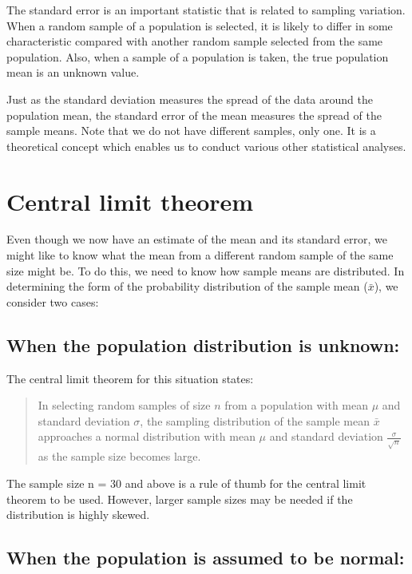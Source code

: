 \documentclass[
]{memoir}
\begin{document}
The standard error is an important statistic that is related to sampling variation. When a random sample of a population is selected, it is likely to differ in some characteristic compared with another random sample selected from the same population. Also, when a sample of a population is taken, the true population mean is an unknown value.

Just as the standard deviation measures the spread of the data around the population mean, the standard error of the mean measures the spread of the sample means. Note that we do not have different samples, only one. It is a theoretical concept which enables us to conduct various other statistical analyses.

\hypertarget{central-limit-theorem}{%
\section{Central limit theorem}\label{central-limit-theorem}}

Even though we now have an estimate of the mean and its standard error, we might like to know what the mean from a different random sample of the same size might be. To do this, we need to know how sample means are distributed. In determining the form of the probability distribution of the sample mean (\(\bar{x}\)), we consider two cases:

\hypertarget{when-the-population-distribution-is-unknown}{%
\subsection{When the population distribution is unknown:}\label{when-the-population-distribution-is-unknown}}

The central limit theorem for this situation states:

\begin{quote}
In selecting random samples of size \(n\) from a population with mean \(\mu\) and standard deviation \(\sigma\), the sampling distribution of the sample mean \(\bar{x}\) approaches a normal distribution with mean \(\mu\) and standard deviation \(\tfrac{\sigma}{\sqrt{n}}\) as the sample size becomes large.
\end{quote}

The sample size n = 30 and above is a rule of thumb for the central limit theorem to be used. However, larger sample sizes may be needed if the distribution is highly skewed.

\hypertarget{when-the-population-is-assumed-to-be-normal}{%
\subsection{When the population is assumed to be normal:}\label{when-the-population-is-assumed-to-be-normal}}
\end{document}
